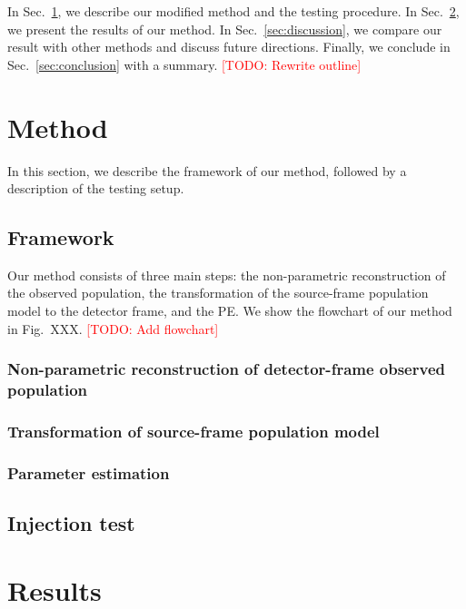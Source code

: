 \documentclass[aps,prd,twocolumn,superscriptaddress,preprintnumbers,nofootinbib,hidelinks]{revtex4-2}
\newcommand{\todo}[1]{\textcolor{red}{[TODO: #1]}}
\begin{document}
In Sec.~\ref{sec:method}, we describe our modified method and the testing procedure.
In Sec.~\ref{sec:results}, we present the results of our method.
In Sec.~\ref{sec:discussion}, we compare our result with other methods and discuss future directions.
Finally, we conclude in Sec.~\ref{sec:conclusion} with a summary.
\todo{Rewrite outline}

\section{Method}
\label{sec:method}

In this section, we describe the framework of our method, followed by a description of the testing setup.

\subsection{Framework}
\label{sec:framework}

Our method consists of three main steps: the non-parametric reconstruction of the observed population, the transformation of the source-frame population model to the detector frame, and the \ac{PE}.
We show the flowchart of our method in Fig.~XXX. \todo{Add flowchart}

\subsubsection{Non-parametric reconstruction of detector-frame observed population}
\label{sec:reconstruction}


\subsubsection{Transformation of source-frame population model}
\label{sec:transformation}

\subsubsection{Parameter estimation}
\label{sec:pe}

\subsection{Injection test}
\label{sec:injection}

\section{Results}
\label{sec:results}
\end{document}
